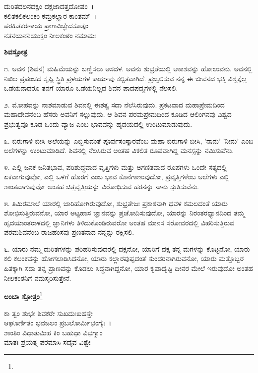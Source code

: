 
\begin{myquote}
ದುರಿತದಲನದಕ್ಷಂ ದಕ್ಷಜಾದತ್ತದೋಷಂ~।\\ಕಲಿತಕಲಿಕಲಂಕಂ ಕಮ್ರಕಲ್ಹಾರ ಕಾಂತಮ್~।\\ಪರಹಿತಕರಣಾಯ ಪ್ರಾಣವಿಚ್ಛೇದಸೂತ್ಕಂ\\ನತನಯನನಿಯುಕ್ತಂ ನೀಲಕಂಠಂ ನಮಾಮಃ
\end{myquote}


\begin{center}
\textbf{ಶಿವಸ್ತೋತ್ರ}
\end{center}

೧. ಅವನ (ಶಿವನ) ಮಹಿಮೆಯನ್ನು ಬಣ್ಣಿಸಲು ಅಸದಳ. ಅವನು ಶುಭ್ರತೆಯಲ್ಲಿ ಆಕಾಶವನ್ನು ಹೋಲುವನು. ಅವನಲ್ಲಿ ನಿಖಿಲ ಪ್ರಪಂಚದ ಸೃಷ್ಟಿ ಸ್ಥಿತಿ ಪ್ರಳಯಗಳ ಕಾರ್ಯವು ಕಲ್ಪಿತವಾಗಿದೆ. ಪ್ರಜ್ವಲಿಸುವ ನನ್ನ ಈ ಜೀವನದ ಭಕ್ತಿ ವಿಶ್ವಕ್ಕೆಲ್ಲ ಒಡೆಯನಾದರೂ ತನಗೆ ಯಾರೂ ಒಡೆಯನಿಲ್ಲದ ಶಿವನ ಪಾದಪದ್ಮಗಳಲ್ಲಿ ನೆಲಸಲಿ.

೨. ಮೋಹವನ್ನು ನಾಶಮಾಡುವ ಶಿವನಲ್ಲಿ ಈಶತ್ವ ಸದಾ ನೆಲೆಸಿರುವುದು. ಪ್ರಕಟವಾದ ಮಹಾಪ್ರೇಮದಿಂದ ಮಹಾದೇವನೆಂಬ ಹೆಸರು ಅವನಿಗೆ ಸಲ್ಲುವುದು. ಆ ಶಿವನ ಪರಮಪ್ರೇಮದಿಂದ ಕೂಡಿದ ಆಲಿಂಗನವು ವಿಶ್ವದ ಪ್ರಭುತ್ವವೂ ಕೂಡ ಒಂದು ವ್ಯಾಜ ಎಂಬ ಭಾವವನ್ನು ಹೃದಯದಲ್ಲಿ ಉಂಟುಮಾಡುವುದು.

೩. ಬಿರುಗಾಳಿ ಬೀಸಿ ಅಲೆಯನ್ನು ಎಬ್ಬಿಸುವಂತೆ ಪೂರ್ವಸಂಸ್ಕಾರವೆಂಬ ಮಹಾ ಬಿರುಗಾಳಿ ಬೀಸಿ, 'ನಾನು' 'ನೀನು' ಎಂಬ ಅಲೆಗಳನ್ನು ಉಂಟುಮಾಡಿದೆ. ಶಿವನಲ್ಲಿ ನೆಲಸಿರುವ ಅಂತಹ ವಿಕಲಿತ ರೂಪವಾಗಿದ್ದ ಮನಸ್ಸನ್ನು ನಮಿಸುವೆನು.

೪. ಎಲ್ಲಿ ಜನಕ ಜನಿತಭಾವ, ಪರಿಶುದ್ಧವಾದ ವೃತ್ತಿಗಳು ಮತ್ತು ಅಗಣಿತವಾದ ರೂಪಗಳು ಒಂದೇ ಸತ್ಯದಲ್ಲಿ ಏಕವಾಗುವುವೋ, ಎಲ್ಲಿ ಒಳಗೆ ಹೊರಗೆ ಎಂಬ ಭಾವ ಕೊನೆಗಾಣುವುದೋ, ಪ್ರವೃತ್ತಿಗಳೆಂಬ ಅಲೆಗಳು ಎಲ್ಲಿ ಶಾಂತವಾಗುವುವೋ ಅಂತಹ ಚಿತ್ತವೃತ್ತಿಯನ್ನು ವಿರೋಧಿಸುವ ಹರನನ್ನು ನಾನು ಸ್ತುತಿಸುವೆನು.

೫. ತಿಮಿರಮಾಲೆ ಯಾರಲ್ಲಿ ಜಾರಿಹೋಗಿರುವುದೋ, ಶುಭ್ರತೇಜಃ ಪ್ರಕಾಶನಾಗಿ ಧವಳ ಕಮಲದಂತೆ ಯಾರು ಶೋಭಿಸುತ್ತಿರುವನೋ, ಯಾರ ಅಟ್ಟಹಾಸ ಜ್ಞಾನವನ್ನು ಪ್ರಚೋದಿಸುವುದೋ, ಯಾರನ್ನು ನಿರಂತರಧ್ಯಾನದಿಂದ ತಮ್ಮ ಹೃದಯಾಂತರಾಳದಲ್ಲಿ ಜ್ಞಾನಿಗಳು ತಿಳಿದುಕೊಂಡಿರುವರೋ ಅಂತಹ ಮಾನಸ ಸರೋವರದಲ್ಲಿ ವಿಹರಿಸುತ್ತಿರುವ ಪರಮಶಿವನೆಂಬ ರಾಜಹಂಸವು ಪ್ರಣತನಾದ ನನ್ನನ್ನು ರಕ್ಷಿಸಲಿ.

೬. ಯಾರು ನಮ್ಮ ದುರಿತಗಳನ್ನು ಪರಿಹರಿಸುವುದರಲ್ಲಿ ದಕ್ಷನೋ, ಯಾರಿಗೆ ದಕ್ಷ ತನ್ನ ಮಗಳನ್ನು ಕೊಟ್ಟನೋ, ಯಾರು ಕಲಿ ಕಲಂಕವನ್ನು ಹೋಗಲಾಡಿಸಿದನೋ, ಯಾರು ಕಲ್ಲಾರಪುಷ್ಪದಂತೆ ಸುಂದರನಾಗಿರುವನೋ, ಯಾರು ಮತ್ತೊಬ್ಬರ ಹಿತಕ್ಕಾಗಿ ಸದಾ ತನ್ನ ಪ್ರಾಣವನ್ನು ಕೊಡಲು ಸಿದ್ಧನಾಗಿದ್ದನೋ, ಯಾರ ಕೃಪಾದೃಷ್ಟಿ ದೀನರ ಮೇಲೆ ಇರುವುದೋ ಅಂತಹ ನೀಲಕಂಠನಿಗೆ ನಮಸ್ಕರಿಸುತ್ತೇನೆ.

\begin{center}
\textbf{ಅಂಬಾ ಸ್ತೋತ್ರಂ}\footnote{}
\end{center}

\begin{myquote}
ಕಾ ತ್ವಂ ಶುಭೇ ಶಿವಕರೇ ಸುಖದುಃಖಹಸ್ತೇ\\ಆಘೂರ್ಣಿತಂ ಭವಜಲಂ ಪ್ರಬಲೋರ್ಮಿಭಂಗೈಃ~।\\ಶಾಂತಿಂ ವಿಧಾತುಮಿಹ ಕಿಂ ಬಹುಧಾ ವಿಭಗ್ನಾಂ\\
ಮಾತಃ ಪ್ರಯತ್ನ ಪರಮಾಸಿ ಸದೈವ ವಿಶ್ವೇ
\end{myquote}

